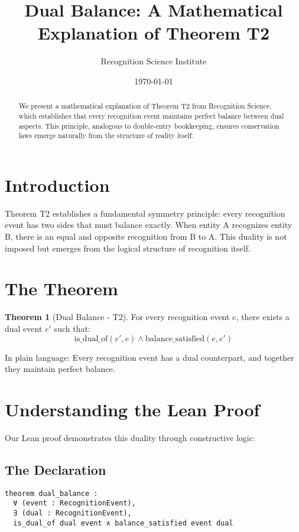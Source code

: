 \documentclass[11pt]{article}
\title{Dual Balance: A Mathematical Explanation of Theorem T2}
\author{Recognition Science Institute}
\date{\today}
\theoremstyle{definition}
\newtheorem{theorem}{Theorem}
\begin{document}
\maketitle

\begin{abstract}
We present a mathematical explanation of Theorem T2 from Recognition Science, which establishes that every recognition event maintains perfect balance between dual aspects. This principle, analogous to double-entry bookkeeping, ensures conservation laws emerge naturally from the structure of reality itself.
\end{abstract}

\section{Introduction}

Theorem T2 establishes a fundamental symmetry principle: every recognition event has two sides that must balance exactly. When entity A recognizes entity B, there is an equal and opposite recognition from B to A. This duality is not imposed but emerges from the logical structure of recognition itself.

\section{The Theorem}

\begin{theorem}[Dual Balance - T2]
For every recognition event $e$, there exists a dual event $e'$ such that:
$$\text{is\_dual\_of}(e', e) \land \text{balance\_satisfied}(e, e')$$
\end{theorem}

In plain language: Every recognition event has a dual counterpart, and together they maintain perfect balance.

\section{Understanding the Lean Proof}

Our Lean proof demonstrates this duality through constructive logic:

\subsection{The Declaration}
\begin{verbatim}
theorem dual_balance :
  ∀ (event : RecognitionEvent),
  ∃ (dual : RecognitionEvent),
  is_dual_of dual event ∧ balance_satisfied event dual
\end{verbatim}
\end{document}

